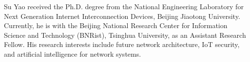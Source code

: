\documentclass[lettersize,journal]{IEEEtran}
\begin{document}
\begin{IEEEbiography}{Su Yao} received the Ph.D. degree from the National Engineering Laboratory for Next Generation Internet Interconnection Devices, Beijing Jiaotong University. Currently, he is with the Beijing National Research Center for Information Science and Technology (BNRist), Tsinghua University, as an Assistant Research Fellow. His research interests include future network architecture, IoT security, and artificial intelligence for network systems.
\end{IEEEbiography}






\vfill
\end{document}
